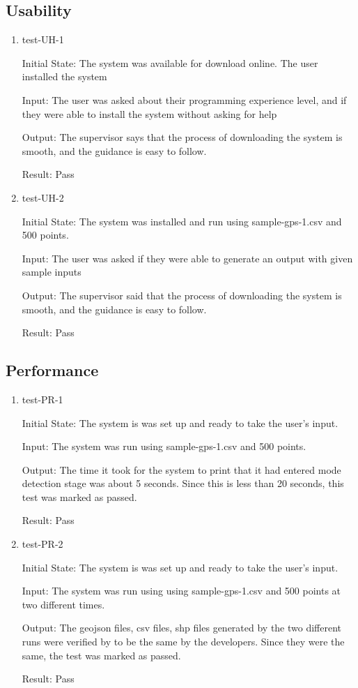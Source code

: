 \documentclass[12pt, titlepage]{article}
\begin{document}
\subsection{Usability}
\begin{enumerate}
\item{test-UH-1} \label{test-UH-1}

Initial State: The system was available for download online. The user installed the system

Input: The user was asked about their programming experience level, and if they were able to install the system without asking for help

Output: The supervisor says that the process of downloading the system is smooth, and the guidance is easy to follow.

Result: Pass

\item{test-UH-2} \label{test-UH-2}

Initial State: The system was installed and run using sample-gps-1.csv and 500 points.

Input: The user was asked if they were able to generate an output with
given sample inputs

Output: The supervisor said that the process of downloading the system is smooth, and the guidance is easy to follow.

Result: Pass

\end{enumerate}
		
\subsection{Performance}
\begin{enumerate}

\item{test-PR-1} \label{test-PR-1}

Initial State: The system is was set up and ready to take the user's input.

Input: The system was run using sample-gps-1.csv and 500 points.

Output: The time it took for the system to print that it had entered mode detection stage was about 5 seconds. Since this is less than 20 seconds, this test was marked as passed.

Result: Pass

\item{test-PR-2} \label{test-PR-2}

Initial State: The system is was set up and ready to take the user's input.

Input: The system was run using using sample-gps-1.csv and 500 points at two different times.

Output: The geojson files, csv files, shp files generated by the two different runs were verified by to be the same by the developers. Since they were the same, the test was marked as passed.

Result: Pass

\end{enumerate}
\end{document}
